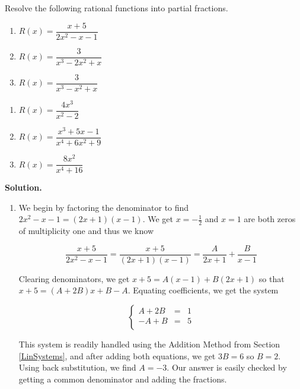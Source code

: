 \begin{ex}  Resolve the following rational functions into partial fractions.

\begin{multicols}{3}
\begin{enumerate}

\item  $R(x) = \dfrac{x+5}{2x^2-x-1}$

\item  $R(x) = \dfrac{3}{x^3-2x^2+x}$

\item  $R(x) = \dfrac{3}{x^3-x^2+x}$

\setcounter{HW}{\value{enumi}}
\end{enumerate}
\end{multicols}


\begin{multicols}{3}
\begin{enumerate}
\setcounter{enumi}{\value{HW}}

\item  $R(x) = \dfrac{4x^3}{x^2-2}$

\item  $R(x) = \dfrac{x^3+5x-1}{x^4+6x^2+9}$

\item  $R(x) = \dfrac{8x^2}{x^4+16}$

\end{enumerate}
\end{multicols}
{\bf Solution.}  

\begin{enumerate}

\item  We begin by factoring the denominator to find $2x^2-x-1 = (2x+1)(x-1)$.  We get $x=-\frac{1}{2}$ and $x=1$ are both zeros of multiplicity one and thus we know

\[\dfrac{x+5}{2x^2-x-1} = \dfrac{x+5}{(2x+1)(x-1)} = \dfrac{A}{2x+1} + \dfrac{B}{x-1}\]

Clearing denominators, we get $x+5 = A(x-1) + B(2x+1)$ so that $x + 5 = (A+2B)x + B-A$.  Equating coefficients, we get the system

\[ \left\{ \begin{array}{rcr}  A+2B & = & 1 \\ -A+B & = & 5 \\ \end{array} \right.\]

This system is readily handled using the Addition Method from Section \ref{LinSystems}, and after adding both equations, we get $3B = 6$ so $B = 2$.  Using back substitution, we find $A = -3$.  Our answer is easily checked by getting a common denominator and adding the fractions.


\end{enumerate}
\end{ex}
